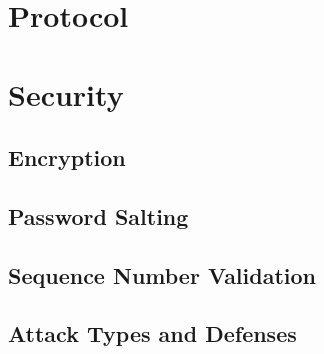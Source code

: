 \documentclass{sig-alternate}
\renewcommand\_{\textunderscore\allowbreak}  %
\begin{document}
\section{Protocol}

\section{Security}

\subsection{Encryption}

\subsection{Password Salting}

\subsection{Sequence Number Validation}

\subsection{Attack Types and Defenses}
	
\end{document}
